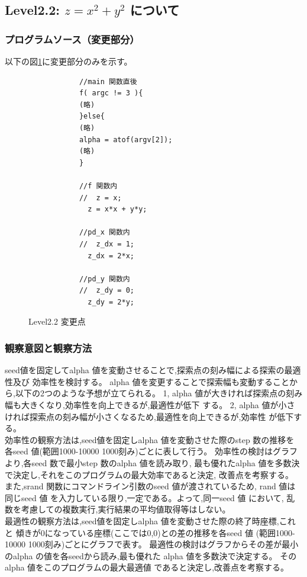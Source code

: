 \subsection{Level2.2: $z=x^2 + y^2$ について}
\subsubsection{プログラムソース（変更部分）}
以下の図\ref{cp22}に変更部分のみを示す。
	\begin{figure}[H]
        \caption{Level2.2 変更点}
		\label{cp22}
		\fontsize{10pt}{10pt}\selectfont
      	\begin{shadebox}
        	\begin{verbatim}
			//main 関数直後
			f( argc != 3 ){
			(略)
			}else{
			(略)
			alpha = atof(argv[2]); 
			(略)
			}
			
			//f 関数内
			//  z = x;
			  z = x*x + y*y;

			//pd_x 関数内
			//  z_dx = 1;
			  z_dx = 2*x;

			//pd_y 関数内
			//  z_dy = 0;
			  z_dy = 2*y;
        	\end{verbatim}
      	\end{shadebox}
     \end{figure}

\subsubsection{観察意図と観察方法}
seed値を固定してalpha 値を変動させることで,探索点の刻み幅による探索の最適性及び
効率性を検討する。
alpha 値を変更することで探索幅も変動することから,以下の2つのような予想が立てられる。
1, alpha 値が大きければ探索点の刻み幅も大きくなり,効率性を向上できるが,最適性が低下
する。
2, alpha 値が小さければ探索点の刻み幅が小さくなるため,最適性を向上できるが,効率性
が低下する。\\
効率性の観察方法は,seed値を固定しalpha 値を変動させた際のstep 数の推移を
各seed 値(範囲1000-10000 1000刻み)ごとに表して行う。
効率性の検討はグラフより,各seed 数で最小step 数のalpha 値を読み取り,
最も優れたalpha 値を多数決で決定し,それをこのプログラムの最大効率であると決定,
改善点を考察する。\\
また,srand 関数にコマンドライン引数のseed 値が渡されているため,
rand 値は同じseed 値 を入力している限り,一定である。よって,同一seed 値 において,
乱数を考慮しての複数実行,実行結果の平均値取得等はしない。\\
最適性の観察方法は,seed値を固定しalpha 値を変動させた際の終了時座標,これと
傾きが0になっている座標(ここでは0,0)との差の推移を各seed 値
(範囲1000-10000 1000刻み)ごとにグラフで表す。
最適性の検討はグラフからその差が最小のalpha の値を各seedから読み,最も優れた
alpha 値を多数決で決定する。
そのalpha 値をこのプログラムの最大最適値 であると決定し,改善点を考察する。

